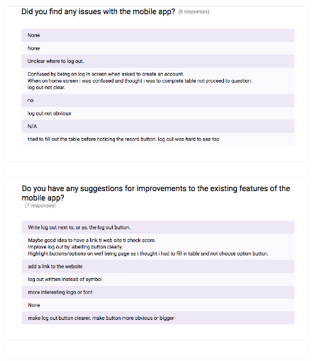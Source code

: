 \documentclass[11pt,openright,a4paper]{report}
\begin{document}
\begin{appendices}
\begin{figure}[ht]
  \centering
  \includegraphics[width=.9\textwidth]{i/testingresponses4.png}
  \includegraphics[width=.9\textwidth]{i/testingresponses5.png}
\end{figure}


\end{appendices}
\end{document}
